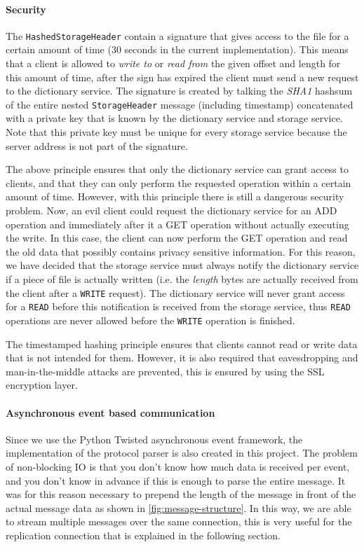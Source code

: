 \documentclass[12pt,a4paper]{scrartcl}
\begin{document}
\paragraph{Security}
The \verb|HashedStorageHeader| contain a signature that gives access to the file for a certain amount of time (30 seconds in the current implementation). This means that a client is allowed to \emph{write to} or \emph{read from} the given offset and length for this amount of time, after the sign has expired the client must send a new request to the dictionary service. The signature is created by talking the \emph{SHA1} hashsum of the entire nested \verb|StorageHeader| message (including timestamp) concatenated with a private key that is known by the dictionary service and storage service. Note that this private key must be unique for every storage service because the server address is not part of the signature.

The above principle ensures that only the dictionary service can grant access to clients, and that they can only perform the requested operation within a certain amount of time. However, with this principle there is still a dangerous security problem. Now, an evil client could request the dictionary service for an ADD operation and immediately after it a GET operation without actually executing the write. In this case, the client can now perform the GET operation and read the old data that possibly contains privacy sensitive information.
For this reason, we have decided that the storage service must always notify the dictionary service if a piece of file is actually written (i.e. the \emph{length} bytes are actually received from the client after a \verb|WRITE| request). The dictionary service will never grant access for a \verb|READ| before this notification is received from the storage service, thus \verb|READ| operations are never allowed before the \verb|WRITE| operation is finished.

The timestamped hashing principle ensures that clients cannot read or write data that is not intended for them. However, it is also required that eavesdropping and man-in-the-middle attacks are prevented, this is ensured by using the SSL encryption layer.

\paragraph{Asynchronous event based communication}
Since we use the Python Twisted asynchronous event framework, the implementation of the protocol parser is also created in this project. The problem of non-blocking IO is that you don't know how much data is received per event, and you don't know in advance if this is enough to parse the entire message. It was for this reason necessary to prepend the length of the message in front of the actual message data as shown in \autoref{fig:message-structure}. %
In this way, we are able to stream multiple messages over the same connection, this is very useful for the replication connection that is explained in the following section.
\end{document}

